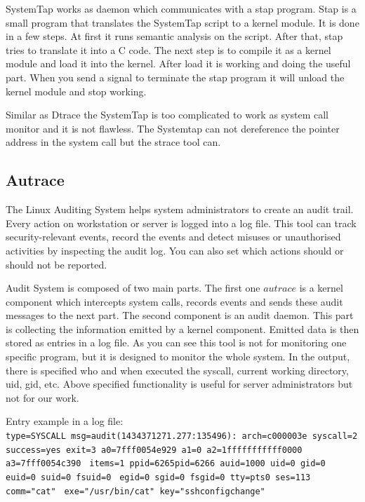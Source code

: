 SystemTap works as daemon which communicates with a stap program.
Stap is a small program that translates the SystemTap script to a kernel module.
It is done in a few steps.
At first it runs semantic analysis on the script.
After that, stap tries to translate it into a C code.
The next step is to compile it as a kernel module and load it into the kernel.
After load it is working and doing the useful part.
When you send a signal to terminate the stap program it will unload the kernel module and stop working.

Similar as Dtrace the SystemTap is too complicated to work as system call monitor and it is not flawless.
The Systemtap can not dereference the pointer address in the system call but the strace tool can.


\subsection{Autrace}
The Linux Auditing System helps system administrators to create an audit trail.
Every action on workstation or server is logged into a log file.
This tool can track security-relevant events, record the events and detect misuses or unauthorised activities by inspecting the audit log.
You can also set which actions should or should not be reported.

Audit System is composed of two main parts.
The first one \(autrace\) is a kernel component which intercepts system calls, records events and sends these audit messages to the next part.
The second component is an audit daemon.
This part is collecting the information emitted by a kernel component.
Emitted data is then stored as entries in a log file.
As you can see this tool is not for monitoring one specific program, but it is designed to monitor the whole system.
In the output, there is specified who and when executed the syscall, current working directory, uid, gid, etc.
Above specified functionality is useful for server administrators but not for our work.

\pagebreak
Entry example in a log file:\\
\noindent
\texttt{type=SYSCALL msg=audit(1434371271.277:135496): arch=c000003e syscall=2}\linebreak
\texttt{success=yes exit=3 a0=7fff0054e929 a1=0 a2=1fffffffffff0000 a3=7fff0054c390 }\linebreak
\texttt{items=1 ppid=6265pid=6266 auid=1000 uid=0 gid=0 euid=0 suid=0 fsuid=0 }\linebreak
\texttt{egid=0 sgid=0 fsgid=0 tty=pts0 ses=113 comm="cat" }\linebreak
\texttt{exe="/usr/bin/cat" key="sshconfigchange"}


